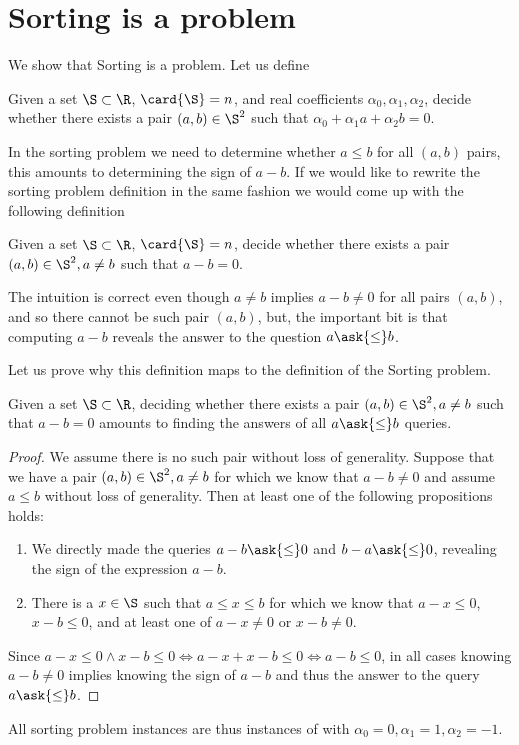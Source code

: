 \section{Sorting is a \twoLDT problem}

We show that Sorting is a \twoLDT problem. Let us define \twoLDT
\begin{problem}[\twoLDT]
Given a set $\S \subset \R$, $\card{\S} = n$, and real coefficients $\alpha_0,
\alpha_1, \alpha_2$, decide whether there exists a pair $(a,b) \in \S^2$ such that
$\alpha_0 + \alpha_1 a + \alpha_2 b = 0$.
\end{problem}

In the sorting problem we need to determine whether $a \le b$ for all $(a,b)$
pairs, this amounts to determining the sign of $a-b$. If we would like to rewrite
the sorting problem definition in the same fashion we would come up with the
following definition
\begin{problem}
Given a set $\S \subset \R$, $\card{\S} = n$, decide whether there exists a
pair $(a,b) \in \S^2, a \neq b$ such that $a - b = 0$.
\end{problem}

The intuition is correct even though $a \neq b$ implies $a-b \neq 0$ for all
pairs \((a,b)\), and so there cannot be such pair \((a,b)\), but, the important
bit is that computing $a-b$ reveals the answer to the question $a \ask{\le} b$.

Let us prove why this definition maps to the definition of the Sorting problem.
\begin{theorem}\label{thm:related:sorting}
Given a set \(\S \subset \R\), deciding whether there exists a pair \((a,b)
\in \S^2, a \neq b\) such that \(a - b = 0\) amounts to finding the answers of all \(a
\ask{\le} b\) queries.
\end{theorem}
\begin{proof}
We assume there is no such pair without loss of generality.
Suppose that we have a pair \((a,b) \in \S^2, a \neq b\) for which we
know that \(a - b \neq 0\) and assume \(a \le b\) without loss of generality.
Then at least one of the following propositions holds:
\begin{enumerate}
\item We directly made the queries \(a - b
\ask{\le} 0\) and \(b - a \ask{\le} 0\), revealing the sign of the expression
\(a - b\).
\item There is a \(x \in \S\) such that \(a \le x \le b\) for which we
know that \(a - x \le 0\), \(x - b \le 0\), and at least one of \(a - x \neq
0\) or \(x - b \neq 0\).
\end{enumerate}
Since \(a - x \le 0 \land x - b \le 0 \iff a - x + x - b \le 0 \iff a - b \le
0\), in all cases knowing \(a - b \neq 0\) implies knowing the sign of \(a -
b\) and thus the answer to the query \(a \ask{\le} b\).
\end{proof}

All sorting problem instances are thus instances of \twoLDT with
$\alpha_0 = 0, \alpha_1 = 1, \alpha_2 = -1$.

